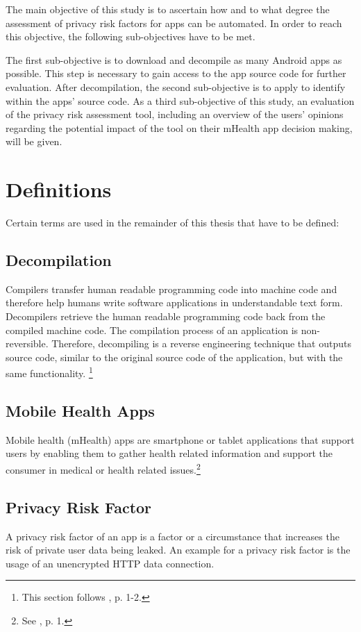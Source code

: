 \documentclass[
	a4paper,
	oneside,
	12pt,
	liststotocnumbered
]{article}
\let\cite\textcite
\begin{document}
The main objective of this study is to ascertain how and to what degree the assessment of privacy risk factors for \mH apps can be automated.
In order to reach this objective, the following sub-objectives have to be met.

The first sub-objective is to download and decompile as many Android apps as possible. This step is necessary to gain access to the app source code for further evaluation.
After decompilation, the second sub-objective is to apply \sca to identify \prfs within the apps' source code.
As a third sub-objective of this study, an evaluation of the privacy risk assessment tool, including an overview of the users’ opinions regarding the potential impact of the tool on their mHealth app decision making, will be given.

\section{Definitions}
Certain terms are used in the remainder of this thesis that have to be defined:

\subsection{Decompilation}

Compilers transfer human readable programming code into machine code and therefore help humans write software applications in understandable text form. 
Decompilers retrieve the human readable programming code back from the compiled machine code. 
The compilation process of an application is non-reversible. Therefore, decompiling is a reverse engineering technique that outputs source code, similar to the original source code of the application, but with the same functionality.  
\footnote{This section follows \cite{nolan2012decompiling}, p. 1-2.}

\subsection{Mobile Health Apps}

Mobile health (\acs{mHealth}) apps are smartphone or tablet applications that support users by enabling them to gather health related information and support the consumer in medical or health related issues.\footnote{See \cite{Dehling2015b}, p. 1.}

\subsection{Privacy Risk Factor}
A privacy risk factor of an app is a factor or a circumstance that increases the risk of private user data being leaked. An example for a privacy risk factor is the usage of an unencrypted HTTP data connection. 
\end{document}
